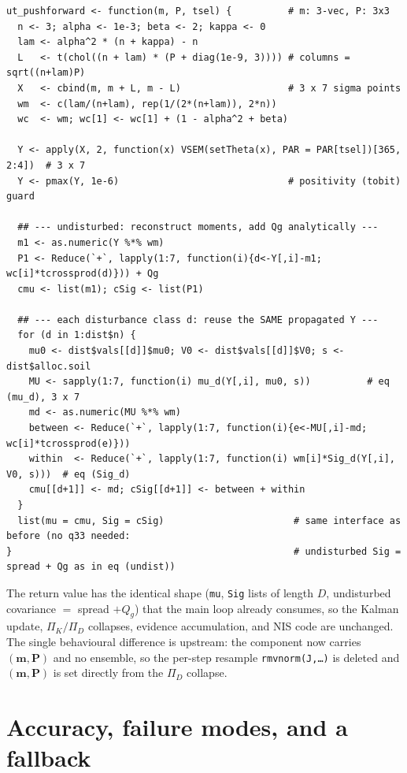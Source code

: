 \documentclass[11pt]{article}
\newcommand{\code}[1]{\texttt{#1}}
\newcommand{\bm}[1]{\boldsymbol{#1}}
\begin{document}
\begin{lstlisting}[caption={UT replacement for \code{vsem\_pushforward}, per component.}]
ut_pushforward <- function(m, P, tsel) {          # m: 3-vec, P: 3x3
  n <- 3; alpha <- 1e-3; beta <- 2; kappa <- 0
  lam <- alpha^2 * (n + kappa) - n
  L   <- t(chol((n + lam) * (P + diag(1e-9, 3)))) # columns = sqrt((n+lam)P)
  X   <- cbind(m, m + L, m - L)                   # 3 x 7 sigma points
  wm  <- c(lam/(n+lam), rep(1/(2*(n+lam)), 2*n))
  wc  <- wm; wc[1] <- wc[1] + (1 - alpha^2 + beta)

  Y <- apply(X, 2, function(x) VSEM(setTheta(x), PAR = PAR[tsel])[365, 2:4])  # 3 x 7
  Y <- pmax(Y, 1e-6)                              # positivity (tobit) guard

  ## --- undisturbed: reconstruct moments, add Qg analytically ---
  m1 <- as.numeric(Y %*% wm)
  P1 <- Reduce(`+`, lapply(1:7, function(i){d<-Y[,i]-m1; wc[i]*tcrossprod(d)})) + Qg
  cmu <- list(m1); cSig <- list(P1)

  ## --- each disturbance class d: reuse the SAME propagated Y ---
  for (d in 1:dist$n) {
    mu0 <- dist$vals[[d]]$mu0; V0 <- dist$vals[[d]]$V0; s <- dist$alloc.soil
    MU <- sapply(1:7, function(i) mu_d(Y[,i], mu0, s))          # eq (mu_d), 3 x 7
    md <- as.numeric(MU %*% wm)
    between <- Reduce(`+`, lapply(1:7, function(i){e<-MU[,i]-md; wc[i]*tcrossprod(e)}))
    within  <- Reduce(`+`, lapply(1:7, function(i) wm[i]*Sig_d(Y[,i], V0, s)))  # eq (Sig_d)
    cmu[[d+1]] <- md; cSig[[d+1]] <- between + within
  }
  list(mu = cmu, Sig = cSig)                       # same interface as before (no q33 needed:
}                                                  # undisturbed Sig = spread + Qg as in eq (undist))
\end{lstlisting}

\noindent The return value has the identical shape (\code{mu}, \code{Sig} lists of length
$D$, undisturbed covariance $=$ spread $+Q_g$) that the main loop already consumes, so the
Kalman update, $\Pi_K/\Pi_D$ collapses, evidence accumulation, and NIS code are unchanged.
The single behavioural difference is upstream: the component now carries $(\bm m,\bm P)$
and no ensemble, so the per-step resample \code{rmvnorm(J,\dots)} is deleted and $(\bm
m,\bm P)$ is set directly from the $\Pi_D$ collapse.

\section{Accuracy, failure modes, and a fallback}
\label{sec:accuracy}
\end{document}
